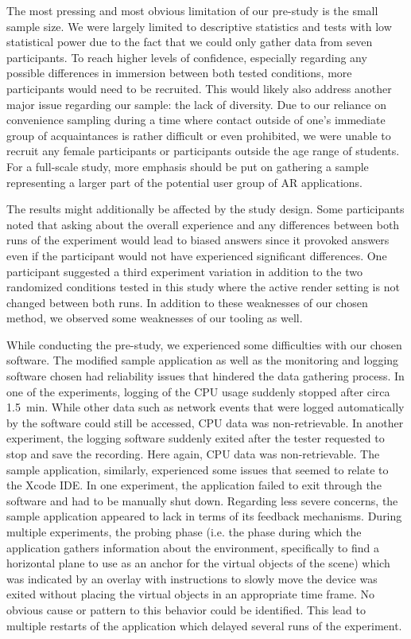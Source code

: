 \documentclass[12pt,twoside,english]{article}
\begin{document}
The most pressing and most obvious limitation of our pre-study is the small sample size.
We were largely limited to descriptive statistics and tests with low statistical power due to the fact that we could only gather data from seven participants.
To reach higher levels of confidence, especially regarding any possible differences in immersion between both tested conditions, more participants would need to be recruited.
This would likely also address another major issue regarding our sample: the lack of diversity.
Due to our reliance on convenience sampling during a time where contact outside of one's immediate group of acquaintances is rather difficult or even prohibited, we were unable to recruit any female participants or participants outside the age range of students.
For a full-scale study, more emphasis should be put on gathering a sample representing a larger part of the potential user group of \gls{AR} applications.

The results might additionally be affected by the study design.
Some participants noted that asking about the overall experience and any differences between both runs of the experiment would lead to biased answers since it provoked answers even if the participant would not have experienced significant differences.
One participant suggested a third experiment variation in addition to the two randomized conditions tested in this study where the active render setting is not changed between both runs.
In addition to these weaknesses of our chosen method, we observed some weaknesses of our tooling as well.

While conducting the pre-study, we experienced some difficulties with our chosen software.
The modified sample application as well as the monitoring and logging software chosen had reliability issues that hindered the data gathering process.
In one of the experiments, logging of the \gls{CPU} usage suddenly stopped after circa 1.5~min.
While other data such as network events that were logged automatically by the software could still be accessed, \gls{CPU} data was non-retrievable.
In another experiment, the logging software suddenly exited after the tester requested to stop and save the recording.
Here again, \gls{CPU} data was non-retrievable.
The sample application, similarly, experienced some issues that seemed to relate to the Xcode \gls{IDE}.
In one experiment, the application failed to exit through the software and had to be manually shut down.
Regarding less severe concerns, the sample application appeared to lack in terms of its feedback mechanisms.
During multiple experiments, the probing phase (i.e. the phase during which the application gathers information about the environment, specifically to find a horizontal plane to use as an anchor for the virtual objects of the scene) which was indicated by an overlay with instructions to slowly move the device was exited without placing the virtual objects in an appropriate time frame.
No obvious cause or pattern to this behavior could be identified.
This lead to multiple restarts of the application which delayed several runs of the experiment.
\end{document}
